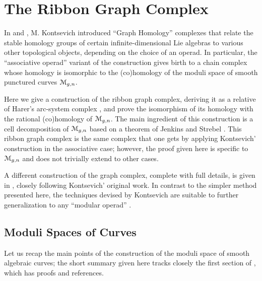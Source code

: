 

\chapter{The Ribbon Graph Complex}
\label{cha:ribbon-graph-complex}

In \cite{kontsevich;1993} and \cite{kontsevich;feynman}, M. Kontsevich
introduced ``Graph Homology'' complexes that relate the stable
homology groups of certain infinite-dimensional Lie algebras to
various other topological objects, depending on the choice of an
operad.  In particular, the ``associative operad'' variant of the
construction gives birth to a chain complex whose homology is
isomorphic to the (co)homology of the moduli space of smooth punctured
curves $\mathcal{M}_{g,n}$.

Here we give a construction of the ribbon graph complex, deriving it
as a relative of Harer's arc-system complex
\cite{harer;cohomological-dimension,
  harer;cohomology-of-moduli}, and prove the isomorphism of its homology
with the rational (co)homology of $\mathcal{M}_{g,n}$.  The main ingredient of
this construction is a cell decomposition of $\mathcal{M}_{g,n}$ based on a
theorem of Jenkins and Strebel
\cite{strebel;quadratic-differentials;1983}.  This ribbon graph
complex is the same complex that one gets by applying Kontsevich'
construction in the associative case; however, the proof given here is
specific to $\mathcal{M}_{g,n}$ and does not trivially extend to other cases.

A different construction of the graph complex, complete with full
details, is given in \cite{conant-vogtmann;2003}, closely following
Kontsevich' original work.  In contrast to the simpler method
presented here, the techniques devised by Kontsevich are suitable to
further generalization to any ``modular operad''
\cite{getzler-kapranov}.



\section{Moduli Spaces of Curves}
\label{sec:moduli-spaces}

Let us recap the main points of the construction of the moduli space
of smooth algebraic curves; the short summary given here tracks
closely the first section of \cite{looijenga;cellular-decomposition},
which has proofs and references.

